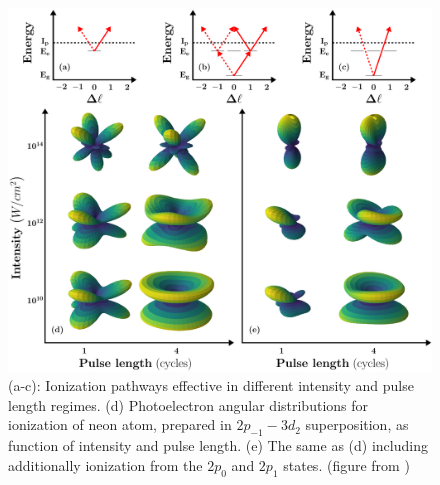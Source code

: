 \begin{figure}[!ht]
\begin{center}
    \includegraphics[width=0.9\linewidth]{figs/Photo_ionization/GAP/combine_fig_1.pdf}
\end{center}
\caption{
(a-c): Ionization pathways effective in different intensity and pulse length regimes. (d) Photoelectron angular distributions for ionization of neon atom, prepared in $2p_{-1}-3d_2$ superposition, as function of intensity and pulse length. (e) The same as (d) including additionally ionization from the $2p_0$ and $2p_1$ states. (figure from \cite{venzke2020_GAP})
} 
  \label{fig:scheme_GAP_lin}
\end{figure}

